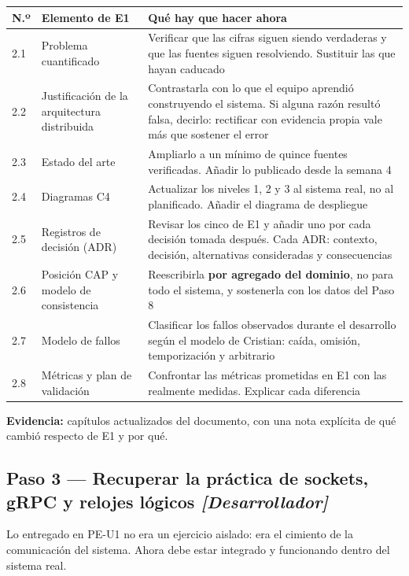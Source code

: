 \documentclass[11pt,a4paper]{article}
\newcommand{\paso}[1]{\subsection{#1}}
\begin{document}
	\begin{center}
		\footnotesize
		\begin{longtable}{@{}p{0.7cm}p{4.6cm}p{9.9cm}@{}}
			\toprule
			\textbf{N.º} & \textbf{Elemento de E1} & \textbf{Qué hay que hacer ahora} \\
			\midrule
			\endhead
			2.1 & Problema cuantificado & Verificar que las cifras siguen siendo verdaderas y que las fuentes siguen resolviendo. Sustituir las que hayan caducado \\
			2.2 & Justificación de la arquitectura distribuida & Contrastarla con lo que el equipo aprendió construyendo el sistema. Si alguna razón resultó falsa, decirlo: rectificar con evidencia propia vale más que sostener el error \\
			2.3 & Estado del arte & Ampliarlo a un mínimo de quince fuentes verificadas. Añadir lo publicado desde la semana 4 \\
			2.4 & Diagramas C4 & Actualizar los niveles 1, 2 y 3 al sistema real, no al planificado. Añadir el diagrama de despliegue \\
			2.5 & Registros de decisión (ADR) & Revisar los cinco de E1 y añadir uno por cada decisión tomada después. Cada ADR: contexto, decisión, alternativas consideradas y consecuencias \\
			2.6 & Posición CAP y modelo de consistencia & Reescribirla \textbf{por agregado del dominio}, no para todo el sistema, y sostenerla con los datos del Paso 8 \\
			2.7 & Modelo de fallos & Clasificar los fallos observados durante el desarrollo según el modelo de Cristian: caída, omisión, temporización y arbitrario \\
			2.8 & Métricas y plan de validación & Confrontar las métricas prometidas en E1 con las realmente medidas. Explicar cada diferencia \\
			\bottomrule
		\end{longtable}
	\end{center}
	
	\textbf{Evidencia:} capítulos actualizados del documento, con una nota explícita de qué cambió respecto de E1 y por qué.
	
	\paso{Paso 3 --- Recuperar la práctica de sockets, gRPC y relojes lógicos \emph{[Desarrollador]}}
	
	Lo entregado en PE-U1 no era un ejercicio aislado: era el cimiento de la comunicación del sistema. Ahora debe estar integrado y funcionando dentro del sistema real.
	
\end{document}
